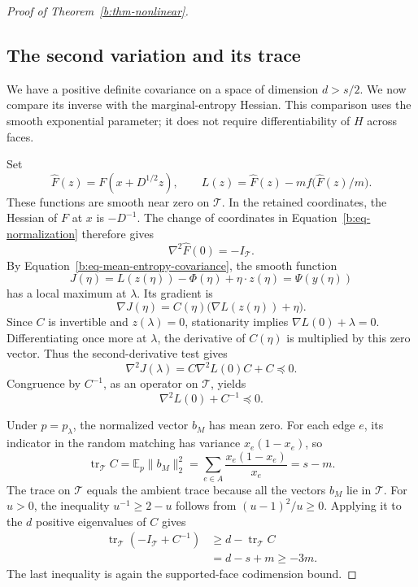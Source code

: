 \begin{proof}[Proof of Theorem~\ref{b:thm-nonlinear}]
\subsection{The second variation and its trace}
\label{b:second-variation}

We have a positive definite covariance on a space of dimension
\(d>s/2\).  We now compare its inverse with the marginal-entropy
Hessian.  This comparison uses the smooth exponential parameter;
it does not require differentiability of \(H\) across faces.

Set
\[
 \widehat F(z)=F(x+D^{1/2}z),\qquad
 L(z)=\widehat F(z)-mf\bigl(\widehat F(z)/m\bigr).
\]
These functions are smooth near zero on \(\mathcal T\).  In the
retained coordinates, the Hessian of \(F\) at \(x\) is \(-D^{-1}\).
The change of coordinates in Equation~\eqref{b:eq-normalization}
therefore gives
\begin{equation}
 \nabla^2\widehat F(0)=-I_{\mathcal T}.
 \label{b:eq-normalized-hessian}
\end{equation}
By Equation~\eqref{b:eq-mean-entropy-covariance}, the smooth function
\[
 J(\eta)=L(z(\eta))-\Phi(\eta)+\eta\cdot z(\eta)
        =\Psi(y(\eta))
\]
has a local maximum at \(\lambda\).  Its gradient is
\[
 \nabla J(\eta)
   =C(\eta)\bigl(\nabla L(z(\eta))+\eta\bigr).
\]
Since \(C\) is invertible and \(z(\lambda)=0\), stationarity implies
\(\nabla L(0)+\lambda=0\).  Differentiating once more at
\(\lambda\), the derivative of \(C(\eta)\) is multiplied by this
zero vector.  Thus the second-derivative test gives
\[
 \nabla^2J(\lambda)=C\nabla^2L(0)C+C\preceq0.
\]
Congruence by \(C^{-1}\), as an operator on \(\mathcal T\), yields
\begin{equation}
 \nabla^2L(0)+C^{-1}\preceq0.
 \label{b:eq-hessian-inequality}
\end{equation}

Under \(p=p_\lambda\), the normalized vector \(b_M\) has mean zero.
For each edge \(e\), its indicator in the random matching has variance
\(x_e(1-x_e)\), so
\begin{equation}
 \operatorname{tr}_{\mathcal T}C
 =\mathbb E_p\|b_M\|_2^2
 =\sum_{e\in A}\frac{x_e(1-x_e)}{x_e}
 =s-m.
 \label{b:eq-covariance-trace}
\end{equation}
The trace on \(\mathcal T\) equals the ambient trace because all
the vectors \(b_M\) lie in \(\mathcal T\).
For \(u>0\), the inequality \(u^{-1}\ge2-u\) follows from
\((u-1)^2/u\ge0\).  Applying it to the \(d\) positive eigenvalues
of \(C\) gives
\begin{equation}
 \begin{split}
 \operatorname{tr}_{\mathcal T}(-I_{\mathcal T}+C^{-1})
 &\ge d-\operatorname{tr}_{\mathcal T}C\\
 &=d-s+m\ge-3m.
 \end{split}
 \label{b:eq-inverse-trace}
\end{equation}
The last inequality is again the supported-face codimension bound.


\end{proof}
